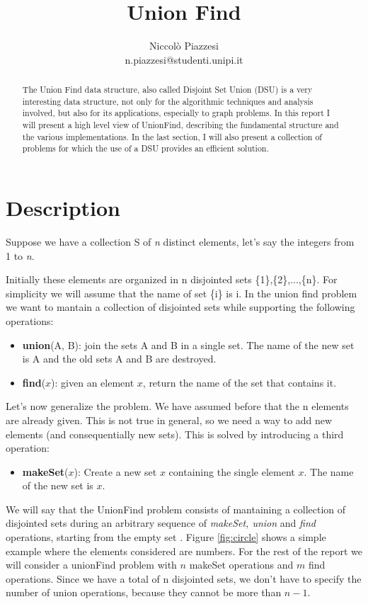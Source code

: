 \documentclass{article}
\begin{document}
\title{ \textbf{Union Find}}
\author{Niccolò Piazzesi\\n.piazzesi@studenti.unipi.it}
\maketitle
\begin{abstract}
The Union Find data structure, also called Disjoint Set Union (DSU) is a very interesting data structure, not 
only  for the algorithmic techniques and  analysis involved, but also for its applications, especially to graph problems. In this
report I will present a high level view of UnionFind, describing the fundamental structure and the various implementations. In the last section, I will also present
a collection of problems for which the use of a DSU provides an efficient solution.
\end{abstract}
\section{Description}
Suppose we have a collection S of \emph{n} distinct elements, let's say the integers from 1 to \emph{n}. 

Initially these elements
are organized in n disjointed sets \{1\},\{2\},...,\{n\}. For simplicity we will assume that the name of set \{i\}
is i. In the union find problem we want to mantain a collection of disjointed sets while supporting the following operations:
\begin{itemize}
    \item \textbf{union}(A, B): join the sets A and B in a single set. The name of the new set is A and the old sets A and B are destroyed.
    \item \textbf{find}($x$): given an element $x$, return the name of the set that contains it.
\end{itemize}
Let's now generalize the problem. We have assumed before that the n elements are already given. This is not true in general, so we need a way to 
add new elements (and consequentially new sets). This is solved by introducing a third operation:
\begin{itemize}
    \item \textbf{makeSet}($x$): Create a new set {$x$} containing the single element $x$. The name of the new set is $x$.
\end{itemize}
We will say that the UnionFind problem consists of mantaining a collection of disjointed sets during 
an arbitrary sequence of \emph{makeSet, union} and \emph{find} operations, starting from the empty set \cite{demetrescu}. Figure \ref{fig:circle} shows a
simple example where the elements considered are numbers. For the rest of the report we will consider a unionFind problem with
$n$ makeSet operations and $m$ find operations. Since we have a total of n disjointed sets, we don't have to specify the number
of union operations, because they cannot be more than $n-1$.
\end{document}
